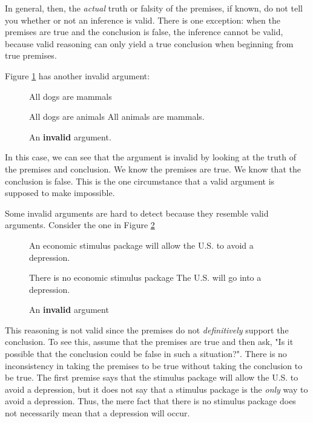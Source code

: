 In general, then, the \textit{actual }truth or falsity of the premises, if known, do not tell you whether or not an inference is valid. There is one exception: when the premises are true and the conclusion is false, the inference cannot be valid, because valid reasoning can only yield a true conclusion when beginning from true premises. 
 
Figure \ref{fig:invalid_animals} has another invalid argument:

\begin{figure}
\begin{mdframed}[style=mytablehalfbox]
\begin{earg*}
\item All dogs are mammals
\item All dogs are animals
\itemc All animals are mammals.
\end{earg*}
\end{mdframed}
\caption{An \textbf{invalid} argument.} \label{fig:invalid_animals}
\end{figure}

In this case, we can see that the argument is invalid by looking at the truth of the premises and conclusion. We know the premises are true. We know that the conclusion is false. This is the one circumstance that a valid argument is supposed to make impossible. 

Some invalid arguments are hard to detect because they resemble valid arguments. Consider the one in Figure \ref{fig:invalid_stimulus}

\begin{figure}[b]
\begin{mdframed}[style=mytablebox]
\begin{earg*}
\item An economic stimulus package will allow the U.S. to avoid a depression. 
\item There is no economic stimulus package
\itemc[.3] The U.S. will go into a depression. 
\end{earg*}
\end{mdframed}
\caption{An \textbf{invalid} argument} \label{fig:invalid_stimulus}
\end{figure}


This reasoning is not valid since the premises do not \textit{definitively} support the conclusion. To see this, assume that the premises are true and then ask, "Is it possible that the conclusion could be false in such a situation?". There is no inconsistency in taking the premises to be true without taking the conclusion to be true. The first premise says that the stimulus package will allow the U.S. to avoid a depression, but it does not say that a stimulus package is the \textit{only }way to avoid a depression. Thus, the mere fact that there is no stimulus package does not necessarily mean that a depression will occur. 

